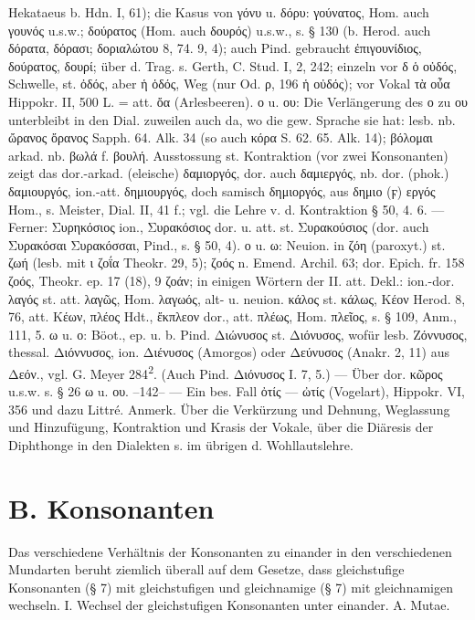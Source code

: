Hekataeus b. Hdn. I, 61); die Kasus von γόνυ u. δόρυ: γούνατος, Hom. auch γουνός u.s.w.; δούρατος (Hom. auch δουρός) u.s.w., s. § 130 (b. Herod. auch δόρατα, δόρασι; δοριαλώτου 8, 74. 9, 4); auch Pind. gebraucht ἐπιγουνίδιος, δούρατος, δουρί; über d. Trag. s. Gerth, C. Stud. I, 2, 242; einzeln vor δ ὁ οὐδός, Schwelle, st. ὀδός, aber ἡ ὁδός, Weg (nur Od. ρ, 196 ἡ οὐδός); vor Vokal τὰ οὖα Hippokr. II, 500 L. = att. ὄα (Arlesbeeren). ο u. ου: Die Verlängerung des ο zu ου unterbleibt in den Dial. zuweilen auch da, wo die gew. Sprache sie hat: lesb. nb. ὤρανος ὄρανος Sapph. 64. Alk. 34 (so auch κόρα S. 62. 65. Alk. 14); βόλομαι arkad. nb. βωλά f. βουλή. Ausstossung st. Kontraktion (vor zwei Konsonanten) zeigt das dor.-arkad. (eleische) δαμιοργός, dor. auch δαμιεργός, nb. dor. (phok.) δαμιουργός, ion.-att. δημιουργός, doch samisch δημιοργός, aus δημιο (ϝ) εργός Hom., s. Meister, Dial. II, 41 f.; vgl. die Lehre v. d. Kontraktion § 50, 4. 6. — Ferner: Συρηκόσιος ion., Συρακόσιος dor. u. att. st. Συρακούσιος (dor. auch Συρακόσαι Συρακόσσαι, Pind., s. § 50, 4). ο u. ω: Neuion. in ζόη (paroxyt.) st. ζωή (lesb. mit ι ζοΐα Theokr. 29, 5); ζοός n. Emend. Archil. 63; dor. Epich. fr. 158 ζοός, Theokr. ep. 17 (18), 9 ζοάν; in einigen Wörtern der II. att. Dekl.: ion.-dor. λαγός st. att. λαγῶς, Hom. λαγωός, alt- u. neuion. κάλος st. κάλως, Κέον Herod. 8, 76, att. Κέων, πλέος Hdt., ἔκπλεον dor., att. πλέως, Hom. πλεῖος, s. § 109, Anm., 111, 5. ω u. ο: Böot., ep. u. b. Pind. Διώνυσος st. Διόνυσος, wofür lesb. Ζόννυσος, thessal. Διόννυσος, ion. Διένυσος (Amorgos) oder Δεύνυσος (Anakr. 2, 11) aus Δεόν., vgl. G. Meyer 284\textsuperscript{2}. (Auch Pind. Διόνυσος I. 7, 5.) — Über dor. κῶρος u.s.w. s. § 26 ω u. ου. --142-- — Ein bes. Fall ὀτίς — ὠτίς (Vogelart), Hippokr. VI, 356 und dazu Littré. Anmerk. Über die Verkürzung und Dehnung, Weglassung und Hinzufügung, Kontraktion und Krasis der Vokale, über die Diäresis der Diphthonge in den Dialekten s. im übrigen d. Wohllautslehre.
\section*{B. Konsonanten}

Das verschiedene Verhältnis der Konsonanten zu einander in den verschiedenen Mundarten beruht ziemlich überall auf dem Gesetze, dass gleichstufige Konsonanten (§ 7) mit gleichstufigen und gleichnamige (§ 7) mit gleichnamigen wechseln.
I. Wechsel der gleichstufigen Konsonanten unter einander. A. Mutae.

